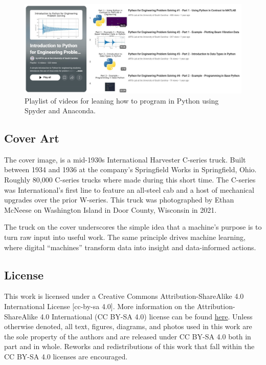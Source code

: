\documentclass[12pt,letter]{article}
\begin{document}
\begin{figure}[H]
	\centering
	\includegraphics[width=6.0in]{figures/python_playlist}
	\vspace{-0.5ex}
	\caption{Playlist of videos for leaning how to program in Python using Spyder and Anaconda.}
	\label{fig:python_playlist}
	\vspace{-1.5ex}
\end{figure} 


\pagebreak
\clearpage                 %
\thispagestyle{noRhead}    %

\vspace{-0.5ex}
\subsection{Cover Art}
\vspace{-1ex}
The cover image, is a mid-1930s International Harvester C-series truck. Built between 1934 and 1936 at the company's Springfield Works in Springfield, Ohio. Roughly 80,000 C-series trucks where made during this short time. The C-series was International's first line to feature an all-steel cab and a host of mechanical upgrades over the prior W-series. This truck was photographed by Ethan McNeese on Washington Island in Door County, Wisconsin in 2021.

The truck on the cover underscores the simple idea that a machine's purpose is to turn raw input into useful work. The same principle drives machine learning, where digital ``machines'' transform data into insight and data-informed actions.



\vspace{-0.5ex}
\subsection{License}
\vspace{-1ex}
This work is licensed under a Creative Commons Attribution-ShareAlike 4.0 International License [cc-by-sa 4.0]. More information on the Attribution-ShareAlike 4.0 International (CC BY-SA 4.0) license can be found 
\href{https://creativecommons.org/licenses/by-sa/4.0/}{here}.
Unless otherwise denoted, all text, figures, diagrams, and photos used in this work are the sole property of the authors and are released under CC BY-SA 4.0 both in part and in whole. Reworks and redistributions of this work that fall within the CC BY-SA 4.0 licenses are encouraged.
\end{document}
